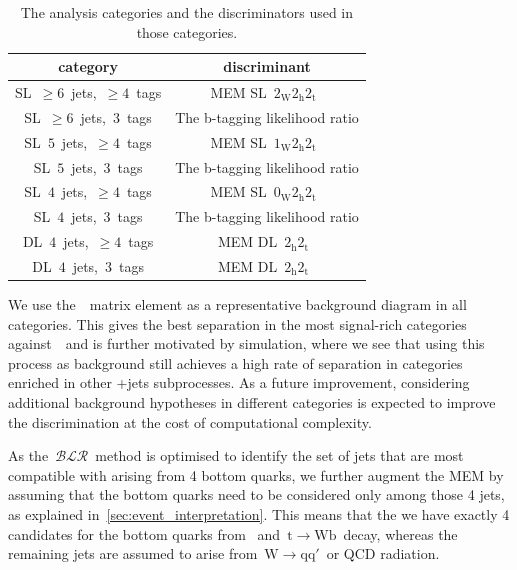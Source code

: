 \begin{table}[h!]
\begin{center}
\caption[The analysis categories for the~\ttHbb~analysis.]{The analysis categories and the discriminators used in those categories.}
\label{tab:cat_discriminant}
\begin{tabular}{c|c}
\hline
category & discriminant \\
\hline
SL~$\geq6$~jets,~$\geq4$~tags & MEM SL~$2_{\mathrm{W}} 2_{\mathrm{h}} 2_{\mathrm{t}}$~\\
SL~$\geq6$~jets,~$3$~tags & The b-tagging likelihood ratio \\
\hline
SL~$5$~jets,~$\geq4$~tags & MEM SL~$1_{\mathrm{W}} 2_{\mathrm{h}} 2_{\mathrm{t}}$~\\
SL~$5$~jets,~$3$~tags & The b-tagging likelihood ratio \\
\hline
SL~$4$~jets,~$\geq4$~tags & MEM SL~$0_{\mathrm{W}} 2_{\mathrm{h}} 2_{\mathrm{t}}$~\\
SL~$4$~jets,~$3$~tags & The b-tagging likelihood ratio \\
\hline
DL~$4$~jets,~$\ge4$~tags & MEM DL~$2_{\mathrm{h}} 2_{\mathrm{t}}$~\\
DL~$4$~jets,~$3$~tags & MEM DL~$2_{\mathrm{h}} 2_{\mathrm{t}}$~\\
\hline
\hline
\end{tabular}
\end{center}
\end{table}

We use the~\ttbb~matrix element as a representative background diagram in all categories. This gives the best separation in the most signal-rich categories against~\ttbb~and is further motivated by simulation, where we see that using this process as background still achieves a high rate of separation in categories enriched in other \ttbar+jets subprocesses. As a future improvement, considering additional background hypotheses in different categories is expected to improve the discrimination at the cost of computational complexity.

As the~$\mathcal{BLR}$~method is optimised to identify the set of jets that are most compatible with arising from 4 bottom quarks, we further augment the MEM by assuming that the bottom quarks need to be considered only among those 4 jets, as explained in~\cref{sec:event_interpretation}. This means that the we have exactly 4 candidates for the bottom quarks from \Hbb~and~$\mathrm{t} \rightarrow \mathrm{W} \mathrm{b}$~decay, whereas the remaining jets are assumed to arise from~$\mathrm{W} \rightarrow \mathrm{q} \mathrm{q}'$~or QCD radiation. 

